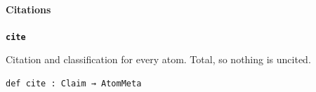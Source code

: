 \documentclass[11pt,paper=\testimonypaper,DIV=13,parskip=false]{scrartcl}
\begin{document}
\paragraph*{Citations}
\leavevmode\par\nobreak
\par\medskip\noindent\textbf{\texttt{cite}}\par\nobreak\noindent
Citation and classification for every atom. Total, so nothing is uncited.

{\small\begin{verbatim}
def cite : Claim → AtomMeta
\end{verbatim}}



\end{document}
